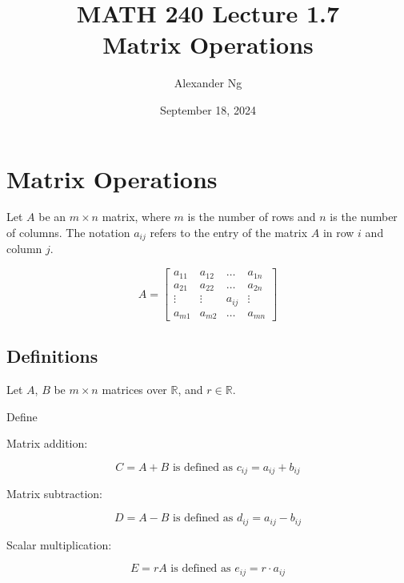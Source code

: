 \documentclass[12pt]{article}
\begin{document}
\title{MATH 240 Lecture 1.7\\Matrix Operations}
\author{Alexander Ng}
\date{September 18, 2024}

\maketitle

\section{Matrix Operations}

Let $A$ be an $m \times n$ matrix, where $m$ is the number of rows and $n$ is
the number of columns. The notation $a_{ij}$ refers to the entry of the matrix $A$ in row $i$ and 
column $j$.

\begin{equation*}
  A = \begin{bmatrix}
    a_{11} & a_{12} & \dots & a_{1n} \\
    a_{21} & a_{22} & \dots & a_{2n} \\
    \vdots & \vdots & a_{ij} & \vdots \\
    a_{m1} & a_{m2} & \dots & a_{mn}
  \end{bmatrix}
\end{equation*}

\subsection{Definitions}

Let $A$, $B$ be $m \times n$ matrices over $\mathbb{R}$, and $r \in \mathbb{R}$.

Define

Matrix addition:

\begin{equation*}
  C = A + B \text{ is defined as } c_{ij} = a_{ij} + b_{ij}
\end{equation*}

Matrix subtraction:

\begin{equation*}
  D = A - B \text{ is defined as } d_{ij} = a_{ij} - b_{ij}
\end{equation*}

Scalar multiplication:

\begin{equation*}
  E = rA \text{ is defined as } e_{ij} = r \cdot a_{ij}
\end{equation*}
\end{document}
